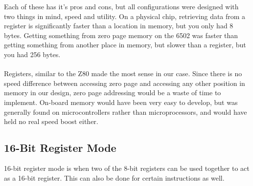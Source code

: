 \documentclass[conference]{IEEEtran}
\begin{document}
Each of these has it's pros and cons, but all configurations were designed with two things in mind, speed and utility. On a physical chip, retrieving data from a register is significantly faster than a location in memory, but you only had 8 bytes. Getting something from zero page memory on the 6502 was faster than getting something from another place in memory, but slower than a register, but you had 256 bytes.\\

\\

Registers, similar to the Z80 made the most sense in our case. Since there is no speed difference between accessing zero page and accessing any other position in memory in our design, zero page addressing would be a waste of time to implement. On-board memory would have been very easy to develop, but was generally found on microcontrollers rather than microprocessors, and would have held no real speed boost either.

\subsection{16-Bit Register Mode}
16-bit register mode is when two of the 8-bit registers can be used together to act as a 16-bit register. This can also be done for certain instructions as well.\\

\\
\end{document}
